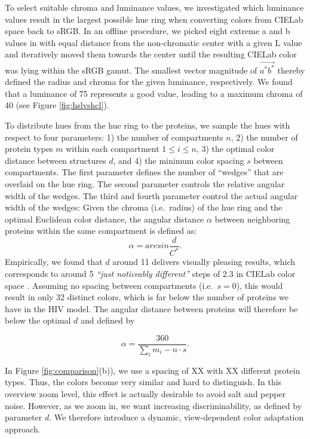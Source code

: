\documentclass[review,journal]{vgtc}         %
\begin{document}
	To select suitable chroma and luminance values, we investigated which luminance values result in the largest possible hue ring when converting colors from CIELab space back to sRGB. 
	In an offline procedure, we picked eight extreme a and b values in with equal distance from the non-chromatic center with a given L value and iteratively moved them towards the center until the resulting CIELab color was lying within the sRGB gamut. 
	The smallest vector magnitude of $\vec{a^*b^*}$ thereby defined the radius and chroma for the given luminance, respectively. 
	We found that a luminance of 75 represents a good value, leading to a maximum chroma of 40 (see Figure \ref{fig:hslvshcl}). 
	
	To distribute hues from the hue ring to the proteins, we sample the hues with respect to four parameters: 1) the number of compartments $n$, 2) the number of protein types $m$ within each compartment $1 \leq i \leq n$, 3) the optimal color distance between structures $d$, and 4) the minimum color spacing $s$ between compartments. 
	The first parameter defines the number of ``wedges'' that are overlaid on the hue ring. 
	The second parameter controls the relative angular width of the wedges. 
	The third and fourth parameter control the actual angular width of the wedges: 
	Given the chroma (i.e.\, radius) of the hue ring and the optimal Euclidean color distance, the angular distance $\alpha$ between neighboring proteins within the same compartment is defined as: 
	\[
	\alpha = arcsin\frac{d}{C^*}. 
	\]
	Empirically, we found that $d$ around 11 delivers visually pleasing results, which corresponds to around 5 \textit{``just noticeably different''} steps of 2.3 in CIELab color space \cite{lee2013perceptually}. 
	Assuming no spacing between compartments (i.e.\, $s=0$), this would result in only 32 distinct colors, which is far below the number of proteins we have in the HIV model. 
	The angular distance between proteins will therefore be below the optimal $d$ and defined by 
	
	\[
	\alpha = \frac{360}{\sum_{i} m_i - n \cdot s}. 
	\]
	
	In Figure \ref{fig:comparison}(b)), we use a spacing of XX with XX different protein types. 
	Thus, the colors become very similar and hard to distinguish. 
	In this overview zoom level, this effect is actually desirable to avoid salt and pepper noise. 
	However, as we zoom in, we want increasing discriminability, as defined by parameter $d$. 
	We therefore introduce a dynamic, view-dependent color adaptation approach. 
	
\end{document}
